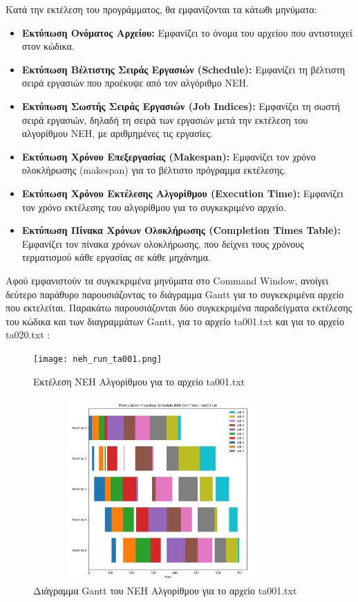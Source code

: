 \documentclass[paper=a4, fontsize=11pt]{scrartcl}
\numberwithin{equation}{section}		%
\numberwithin{figure}{section}			%
\numberwithin{table}{section}				%
\begin{document}
    Κατά την εκτέλεση του προγράμματος, θα εμφανίζονται τα κάτωθι μηνύματα:
    
\begin{itemize}
  \item \textbf{Εκτύπωση Ονόματος Αρχείου:} Εμφανίζει το όνομα του αρχείου που αντιστοιχεί στον κώδικα. 
  \item \textbf{Εκτύπωση Βέλτιστης Σειράς Εργασιών (Schedule):} Εμφανίζει τη βέλτιστη σειρά εργασιών που προέκυψε από τον αλγόριθμο NEH.
  \item \textbf{Εκτύπωση Σωστής Σειράς Εργασιών (Job Indices):} Εμφανίζει τη σωστή σειρά εργασιών, δηλαδή τη σειρά των εργασιών μετά την εκτέλεση του αλγορίθμου NEH, με αριθμημένες τις εργασίες.
  \item \textbf{Εκτύπωση Χρόνου Επεξεργασίας (Makespan):} Εμφανίζει τον χρόνο ολοκλήρωσης (makespan) για το βέλτιστο πρόγραμμα εκτέλεσης.
  \item \textbf{Εκτύπωση Χρόνου Εκτέλεσης Αλγορίθμου (Execution Time):} Εμφανίζει τον χρόνο εκτέλεσης του αλγορίθμου για το συγκεκριμένο αρχείο.
  \item \textbf{Εκτύπωση Πίνακα Χρόνων Ολοκλήρωσης (Completion Times Table):} Εμφανίζει τον πίνακα χρόνων ολοκλήρωσης, που δείχνει τους χρόνους τερματισμού κάθε εργασίας σε κάθε μηχάνημα.
\end{itemize}

    Αφού εμφανιστούν τα συγκεκριμένα μηνύματα στο Command Window, ανοίγει δεύτερο παράθυρο παρουσιάζοντας το διάγραμμα Gantt για το συγκεκριμένα αρχείο που εκτελείται. Παρακάτω παρουσιάζονται δύο συγκεκριμένα παραδείγματα εκτέλεσης του κώδικα και των διαγραμμάτων Gantt, για το αρχείο ta001.txt και για το αρχείο ta020.txt :
   

\begin{figure}[H]
   \centering
   \texttt{[image: neh\_run\_ta001.png]}
   \caption{Εκτέλεση NEH Αλγορίθμου για το αρχείο ta001.txt}
   \label{fig:neh_ta001}
\end{figure} 

\newpage
\begin{figure}[H]
   \centering
   \includegraphics[width=10cm, height=7cm]{neh_run_ta001_gantt.png}
   \caption{Διάγραμμα Gantt του NEH Αλγορίθμου για το αρχείο ta001.txt}
   \label{fig:nehG_ta001}
\end{figure} 
\end{document}

